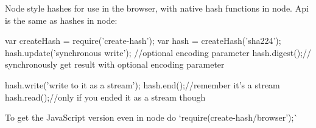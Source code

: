\href{https://travis-ci.org/crypto-browserify/createHash}{\tt }

Node style hashes for use in the browser, with native hash functions in node. Api is the same as hashes in node\+:


\begin{DoxyCode}
var createHash = require('create-hash');
var hash = createHash('sha224');
hash.update('synchronous write'); //optional encoding parameter
hash.digest();// synchronously get result with optional encoding parameter

hash.write('write to it as a stream');
hash.end();//remember it's a stream
hash.read();//only if you ended it as a stream though
\end{DoxyCode}


To get the Java\+Script version even in node do `require(\textquotesingle{}create-\/hash/browser');\`{} 